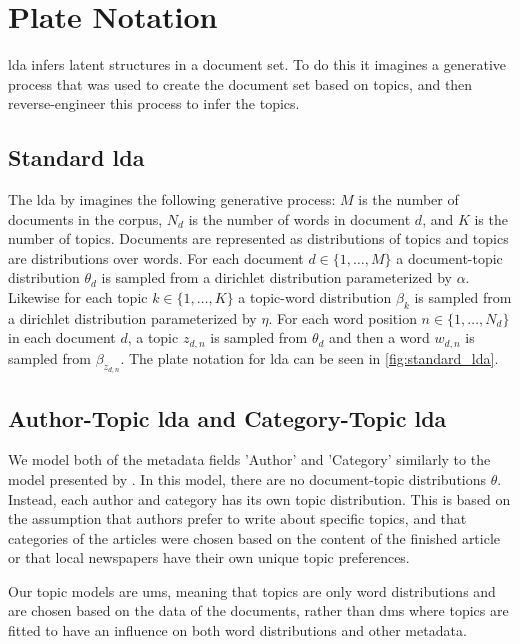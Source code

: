 \section{Plate Notation}
\Gls{lda} infers latent structures in a document set. 
To do this it imagines a generative process that was used to create the document set based on topics, and then reverse-engineer this process to infer the topics.

\subsection{Standard \gls{lda}}
The \gls{lda} by \citet{blei2003latent} imagines the following generative process:
$M$ is the number of documents in the corpus, $N_d$ is the number of words in document $d$, and $K$ is the number of topics.
Documents are represented as distributions of topics and topics are distributions over words.
For each document $d \in \{1,\dots, M\}$ a document-topic distribution $\theta_d$ is sampled from a dirichlet distribution parameterized by $\alpha$.
Likewise for each topic $k \in \{1,\dots, K\}$ a topic-word distribution $\beta_k$ is sampled from a dirichlet distribution parameterized by $\eta$.
For each word position $n \in \{1, \dots, N_d\}$ in each document $d$, a topic $z_{d,n}$ is sampled from $\theta_d$ and then a word $w_{d,n}$ is sampled from $\beta_{z_{d,n}}$.
The plate notation for \gls{lda} can be seen in \autoref{fig:standard_lda}.



\subsection{Author-Topic \gls{lda} and Category-Topic \gls{lda}}
We model both of the metadata fields 'Author' and 'Category' similarly to the model presented by \citet{author_topic_2012}.
In this model, there are no document-topic distributions $\theta$.
Instead, each author and category has its own topic distribution.
This is based on the assumption that authors prefer to write about specific topics, and that categories of the articles were chosen based on the content of the finished article or that local newspapers have their own unique topic preferences.

Our topic models are \glspl{um}, meaning that topics are only word distributions and are chosen based on the data of the documents, rather than \glspl{dm} where topics are fitted to have an influence on both word distributions and other metadata.

